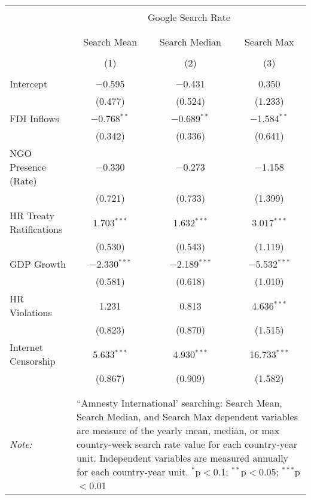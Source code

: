 
\begin{table}[!htbp] \centering 
  \caption{} 
  \label{} 
\begin{tabular}{@{\extracolsep{5pt}}lccc} 
\\[-1.8ex]\hline 
\hline \\[-1.8ex] 
 & \multicolumn{3}{c}{Google Search Rate} \\ 
\cline{2-4} 
\\[-1.8ex] & \multicolumn{3}{c}{ } \\ 
 & Search Mean & Search Median & Search Max \\ 
\\[-1.8ex] & (1) & (2) & (3)\\ 
\hline \\[-1.8ex] 
 Intercept & $-$0.595 & $-$0.431 & 0.350 \\ 
  & (0.477) & (0.524) & (1.233) \\ 
  FDI Inflows & $-$0.768$^{**}$ & $-$0.689$^{**}$ & $-$1.584$^{**}$ \\ 
  & (0.342) & (0.336) & (0.641) \\ 
  NGO Presence (Rate) & $-$0.330 & $-$0.273 & $-$1.158 \\ 
  & (0.721) & (0.733) & (1.399) \\ 
  HR Treaty Ratifications & 1.703$^{***}$ & 1.632$^{***}$ & 3.017$^{***}$ \\ 
  & (0.530) & (0.543) & (1.119) \\ 
  GDP Growth & $-$2.330$^{***}$ & $-$2.189$^{***}$ & $-$5.532$^{***}$ \\ 
  & (0.581) & (0.618) & (1.010) \\ 
  HR Violations & 1.231 & 0.813 & 4.636$^{***}$ \\ 
  & (0.823) & (0.870) & (1.515) \\ 
  Internet Censorship & 5.633$^{***}$ & 4.930$^{***}$ & 16.733$^{***}$ \\ 
  & (0.867) & (0.909) & (1.582) \\ 
 \hline \\[-1.8ex] 
\hline 
\hline \\[-1.8ex] 
\textit{Note:}  & \multicolumn{3}{l}{\parbox[t]{8cm}{``Amnesty International' searching: Search Mean, Search Median, and Search Max dependent variables are measure of the yearly mean, median, or max country-week search rate value for each country-year unit. Independent variables are measured annually for each country-year unit. $^{*}$p$<$0.1; $^{**}$p$<$0.05; $^{***}$p$<$0.01}} \\ 
\end{tabular} 
\end{table} 

